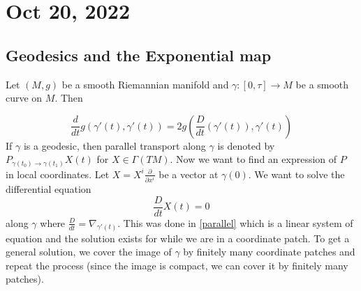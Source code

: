 \documentclass[12pt,a4paper]{article}
\theoremstyle{definition}
\theoremstyle{greenbox}
\newcommand{\dohi}{\frac{\partial}{\partial x^i}}
\begin{document}
    \section{Oct 20, 2022}

    \subsection*{Geodesics and the Exponential map}
    Let $ (M,g) $ be a smooth Riemannian manifold and $ \gamma : [0, \tau] \to M $ be a smooth curve on $ M $. Then 

    \[ \frac{d}{dt}g\left(\gamma'(t), \gamma'(t)\right) = 2g\left( \frac{D}{dt}(\gamma'(t)), \gamma'(t)\right) \]
    If $ \gamma $ is a geodesic, then parallel transport along $ \gamma $ is denoted by $ P_{\gamma(t_{0}) \to \gamma(t_{1})} X(t) $ for $ X \in \Gamma(TM) $. Now we want to find an expression of $ P $ in local coordinates. Let $ X = X^{i}\dohi $ be a vector at $ \gamma(0) $. We want to solve the differential equation 
    \[ \frac{D}{dt}X(t) = 0 \]
    along $ \gamma $ where $ \frac{D}{dt} = \nabla_{\gamma'(t)} $.  This was done in \cref{parallel} which is a linear system of equation and the solution exists for while we are in a coordinate patch. To get a general solution, we cover the image of $ \gamma $ by finitely many coordinate patches and repeat the process (since the image is compact, we can cover it by finitely many patches). 
\end{document}
